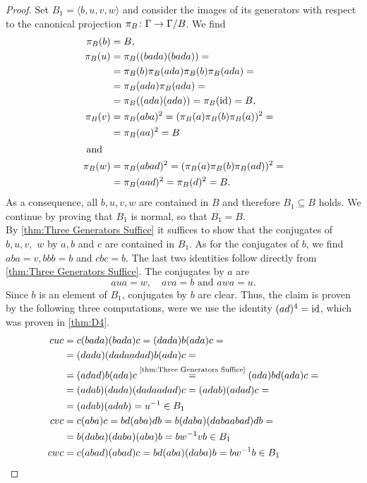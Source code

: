 \begin{proof}
Set $B_1=\langle b,u,v,w\rangle$ and consider the images of its generators with respect to the canonical projection $\pi_B\colon\Gamma\to\nicefrac{\Gamma}{B}$. We find
\begin{align*}
\pi_B(b)&=B,\\
\pi_B(u)	&=\pi_B((bada)(bada))=\\
				&=\pi_B(b)\pi_B(ada)\pi_B(b)\pi_B(ada)=\\
				&=\pi_B(ada)\pi_B(ada)=\\
				&=\pi_B((ada)(ada))=\pi_B(\id)=B,\\
\pi_B(v)	&=\pi_B(aba)^2=(\pi_B(a)\pi_B(b)\pi_B(a))^2=\\
				&=\pi_B(aa)^2=B \\
\intertext{ and}
\pi_B(w)	&=\pi_B(abad)^2=(\pi_B(a)\pi_B(b)\pi_B(ad))^2=\\
		&=\pi_B(aad)^2=\pi_B(d)^2=B.
\end{align*}
As a consequence, all $b,u,v,w$ are contained in $B$ and therefore $B_1\subseteq B$ holds. We continue by proving that $B_1$ is normal, so that $B_1=B$.\\
By \cref{thm:Three Generators Suffice} it suffices to show that the conjugates of $b,u,v,$ $w$ by $a,b$ and $c$ are contained in $B_1$. As for the conjugates of $b$, we find $aba=v, bbb=b$ and $cbc=b$. The last two identities follow directly from \cref{thm:Three Generators Suffice}. The conjugates by $a$ are
\begin{equation*}
aua=w, \quad ava=b \text{ and } awa=u.
\end{equation*}
Since $b$ is an element of $B_1$, conjugates by $b$ are clear. Thus, the claim is proven by the following three computations, were we use the identity $(ad)^4=\id$, which was proven in \cref{thm:D4}.
\begin{align*}
cuc	&=c(bada)(bada)c=(dada)b(ada)c=\\
	&=(dada)(dadaadad)b(ada)c=\\
	&=(adad)b(ada)c\overset{\text{\cref{thm:Three Generators Suffice}}}{=}(ada)bd(ada)c=\\
	&=(adab)(dada)(dadaadad)c=(adab)(adad)c=\\
	&=(adab)(adab)=u^{-1}\in B_1\\
cvc	&=c(aba)c=bd(aba)db=b(daba)(dabaabad)db=\\
	&=b(daba)(daba)(aba)b=bw^{-1}vb\in B_1\\
cwc	&=c(abad)(abad)c=bd(aba)(daba)b=bw^{-1}b\in B_1
\end{align*}

\end{proof}
